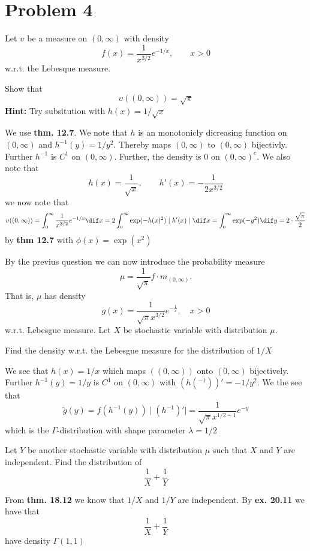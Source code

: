 \section{Problem 4} %
\label{sec:problem_4 2013}
Let \(\upsilon\) be a measure on \((0,\infty)\) with density
\[
	f(x)=\frac{1}{x^{3/2}}e^{-1/x}, \qquad x>0
\]
w.r.t. the Lebesque measure.
\begin{problem}
Show that
\[
	\upsilon((0,\infty))=\sqrt{\pi}
\]
\textbf{Hint:} Try subsitution with \(h(x)=1/\sqrt{x}\)
\end{problem}
\begin{solution}
We use \textbf{thm. 12.7}. We note that \(h\) is an monotonicly dicreasing function on \((0,\infty)\) and \(h^{-1}(y)=1/y^2\). Thereby maps \((0,\infty)\) to \((0,\infty)\) bijectivly. Further \(h^{-1}\) is \(C^1\) on \((0,\infty)\). Further, the density is 0 on \((0,\infty)^{c}\). We also note that
\[
	h(x)=\frac{1}{\sqrt{x}},\qquad h'(x)=-\frac{1}{2x^{3/2}}
\]
we now note that
\[
	\upsilon((0,\infty))=\int_0^\infty \frac{1}{x^{3/2}}e^{-1/x}\dif x=2\int_0^\infty\exp(-h(x)^2)\mid h'(x)\mid \dif x = \int_0^\infty \exp(-y^2)\dif y=2\cdot\frac{\sqrt{\pi}}{2}
\]
by \textbf{thm 12.7} with \(\phi(x)=\exp(x^2)\)
\end{solution}
By the previus question we can now introduce the probability measure
\[
	\mu=\frac{1}{\sqrt{\pi}}f\cdot m_{(0,\infty)}.
\]
That is, \(\mu\) has density
\[
	g(x)=\frac{1}{\sqrt{\pi}x^{3/2}}e^{-\frac{1}{x}}, \quad x>0
\]
w.r.t. Lebesgue measure. Let \(X\) be  stochastic variable with distribution \(\mu\).
\begin{problem}
Find the density w.r.t. the Lebesgue measure for the distribution of \(1/X\)
\end{problem}
\begin{solution}
We see that \(h(x)=1/x\) which maps \(((0,\infty) )\)  onto \((0,\infty)\) bijectively. Further \(h^{-1}(y)=1/y\) is \(C^1\) on \((0,\infty)\) with \(\left(h(^{-1})\right)'=-1/y^2\).
We the see that
\[
	\tilde{g}(y)=f(h^{-1}(y))\mid (h^{-1})'\mid = \frac{1}{\sqrt{\pi}x^{1/2-1}}e^{-y}
\]
which is the \(\Gamma\)-distribution with shape parameter \(\lambda=1/2\)
\end{solution}
\begin{problem}
Let \(Y\) be another stochastic variable with distribution \(\mu\) such that \(X\) and \(Y\) are independent. Find the distribution of
\[
	\frac{1}{X}+\frac{1}{Y}
\]
\begin{solution}
From \textbf{thm. 18.12} we know that \(1/X\) and \(1/Y\) are independent. By \textbf{ex. 20.11} we have that
\[
	\frac{1}{X}+\frac{1}{Y}
\]
 have density \(\Gamma(1,1)\)
\end{solution}
\end{problem}

